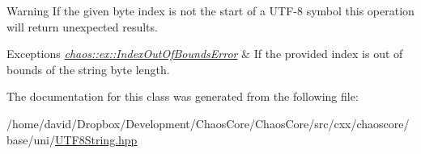 \begin{DoxyWarning}{Warning}
If the given byte index is not the start of a U\-T\-F-\/8 symbol this operation will return unexpected results.
\end{DoxyWarning}

\begin{DoxyExceptions}{Exceptions}
{\em \hyperlink{classchaos_1_1ex_1_1_index_out_of_bounds_error}{chaos\-::ex\-::\-Index\-Out\-Of\-Bounds\-Error}} & If the provided index is out of bounds of the string byte length. \\
\hline
\end{DoxyExceptions}


The documentation for this class was generated from the following file\-:\begin{DoxyCompactItemize}
\item 
/home/david/\-Dropbox/\-Development/\-Chaos\-Core/\-Chaos\-Core/src/cxx/chaoscore/base/uni/\hyperlink{_u_t_f8_string_8hpp}{U\-T\-F8\-String.\-hpp}\end{DoxyCompactItemize}
